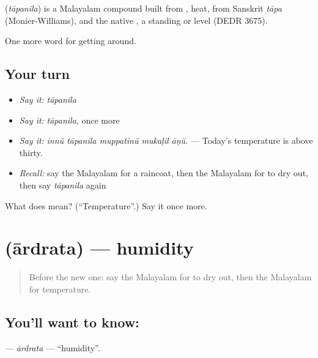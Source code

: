 \begin{cousinweb}
\textbf{} (\emph{tāpanila}) is a Malayalam compound built from , heat, from Sanskrit \emph{tāpa} (Monier-Williams), and the native , a standing or level (DEDR 3675).
\end{cousinweb}

\begin{grammarlens}[title={What you've built}]
One more word for getting around.
\end{grammarlens}

\subsection*{Your turn}
\begin{itemize}
\raggedright
  \item \emph{Say it:} \emph{tāpanila}
  \item \emph{Say it:} \emph{tāpanila}, once more
  \item \emph{Say it:} \emph{innŭ tāpanila muppatinŭ mukaḷil āṇŭ.} — Today's temperature is above thirty.
  \item \emph{Recall:} say the Malayalam for a raincoat, then the Malayalam for to dry out, then say \emph{tāpanila} again
\end{itemize}

\begin{tcolorbox}[breakable,colback=teal!4,colframe=teal!35!black,title={Before you move on}]
What does  mean? (\textquotedblleft{}Temperature\textquotedblright{}.) Say it once more.
\end{tcolorbox}
\section[\texorpdfstring{\ml{ആർദ്രത} (ārdrata)}{ആർദ്രത (ārdrata)}]{ (ārdrata) — humidity}

\label{lesson:ML-C509-ardrata}



\begin{quote}
Before the new one: say the Malayalam for to dry out, then the Malayalam for temperature.
\end{quote}

\subsection*{You'll want to know: }
\textbf{} — \emph{ārdrata} — \textquotedblleft{}humidity\textquotedblright{}.

